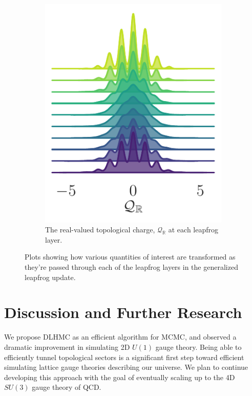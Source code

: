 \documentclass{article} %
\begin{document}
\begin{figure}[hbpt]
\begin{subfigure}[b]{0.315\textwidth}
      \includegraphics[width=\textwidth]{figures/ridgeplots/sinQf.pdf}
      \caption{\label{fig:sinQf}The real-valued topological charge, \(\mathcal{Q}_{\mathbb{R}}\) at each
      leapfrog layer.}%
   \end{subfigure}
   \caption{Plots showing how various quantities of interest are transformed as they're passed through each of the
   leapfrog layers in the generalized leapfrog update.}
\end{figure}
%
\section{Discussion and Further Research}
We propose DLHMC as an efficient algorithm for MCMC, and observed a dramatic improvement in simulating 2D $U(1)$ gauge
theory.
%
Being able to efficiently tunnel topological sectors is a significant first step toward efficient simulating lattice
gauge theories describing our universe.
%
We plan to continue developing this approach with the goal of eventually scaling up to the 4D \(SU(3)\) gauge theory of
QCD.\@
%
\end{document}
